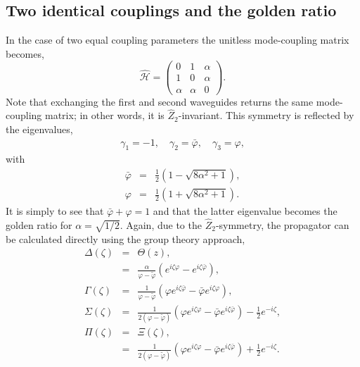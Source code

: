 \documentclass[9pt,twocolumn,twoside]{osajnl}
\begin{document}
\subsection{Two identical couplings and the golden ratio}
In the case of two equal coupling parameters the unitless mode-coupling matrix becomes,
\begin{equation}
\hat{\mathcal{H}}=\left( \begin{array}{ccc}
0 & 1 & \alpha \\
1 & 0 & \alpha \\
\alpha & \alpha & 0 \end{array} \right)	 .
\end{equation}
Note that exchanging the first and second waveguides returns the same mode-coupling matrix; in other words, it is $\hat{Z}_2$-invariant. 
This symmetry is reflected by the eigenvalues,
\begin{eqnarray}
\gamma_{1} = -1, \quad \gamma_{2} = \bar{\varphi}, \quad \gamma_{3} = \varphi,
\end{eqnarray}  
with
\begin{eqnarray}
\bar{\varphi} &=& \frac{1}{2} \left(1-\sqrt{8 \alpha ^2+1}\right),\\
\varphi &=& \frac{1}{2} \left( 1 + \sqrt{8 \alpha ^2+1} \right).
\end{eqnarray}
It is simply to see that $\bar{\varphi} + \varphi = 1$ and that the latter eigenvalue 
becomes the golden ratio for $\alpha = \sqrt{1/2}$.
Again, due to the $\hat{Z}_2$-symmetry, the propagator can be calculated directly using the group theory approach,
\begin{eqnarray}
\Delta(\zeta) &=& \Theta(z), \\
&=& \frac{\alpha}{\varphi - \tilde{\varphi}} \left(  e^{i \zeta \varphi }  -  e^{i \zeta \bar{\varphi} } \right), \\
\Gamma(\zeta) &=& \frac{1}{\varphi - \tilde{\varphi}} \left( \varphi e^{i \zeta \bar{\varphi} } - \bar{\varphi}  e^{i \zeta \varphi } \right), \\
\Sigma(\zeta) &=& \frac{1}{2 \left( \varphi - \tilde{\varphi} \right)} \left( \varphi e^{i \zeta \varphi } - \bar{\varphi} e^{i \zeta \bar{\varphi} } \right) - \frac{1}{2} e^{-i \zeta}, \\
\Pi(\zeta) &=& \Xi(\zeta), \\
&=& \frac{1}{2 \left( \varphi - \tilde{\varphi} \right)} \left( \varphi e^{i \zeta \varphi } - \bar{\varphi} e^{i \zeta \bar{\varphi} } \right) + \frac{1}{2} e^{-i \zeta}.
\end{eqnarray}
\end{document}
